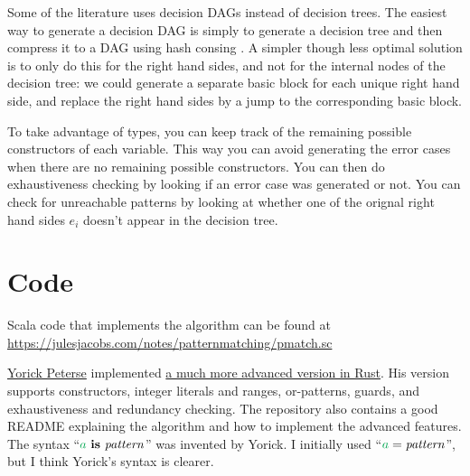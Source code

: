 \documentclass[a4paper, 11pt]{article}
\theoremstyle{definition}
\begin{document}
Some of the literature uses decision DAGs instead of decision trees. The easiest way to generate a decision DAG is simply to generate a decision tree and then compress it to a DAG using hash consing \cite{maranget_compiling_2008}. A simpler though less optimal solution is to only do this for the right hand sides, and not for the internal nodes of the decision tree: we could generate a separate basic block for each unique right hand side, and replace the right hand sides by a jump to the corresponding basic block.

To take advantage of types, you can keep track of the remaining possible constructors of each variable. This way you can avoid generating the error cases when there are no remaining possible constructors. You can then do exhaustiveness checking by looking if an error case was generated or not. You can check for unreachable patterns by looking at whether one of the orignal right hand sides $e_i$ doesn't appear in the decision tree.

\section{Code}

Scala code that implements the algorithm can be found at \\ \url{https://julesjacobs.com/notes/patternmatching/pmatch.sc}

\medskip

\noindent
\href{https://yorickpeterse.com/}{Yorick Peterse} implemented \href{https://gitlab.com/yorickpeterse/pattern-matching-in-rust/-/tree/main/jacobs2021}{a much more advanced version in Rust}.
His version supports constructors, integer literals and ranges, or-patterns, guards, and exhaustiveness and redundancy checking.
The repository also contains a good README explaining the algorithm and how to implement the advanced features.
The syntax ``$\ba \is \patt$'' was invented by Yorick. I initially used ``$\ba = \patt$'', but I think Yorick's syntax is clearer.

\nocite{*}


\end{document}
